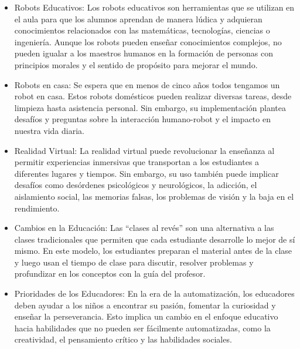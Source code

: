 \documentclass[letterpaper, 12pt]{article}
\begin{document}
\begin{itemize}[label=$\triangleright$]
    \item Robots Educativos: Los robots educativos son herramientas
          que se utilizan en el aula para que los alumnos aprendan de
          manera lúdica y adquieran conocimientos relacionados con
          las matemáticas, tecnologías, ciencias o ingeniería. Aunque
          los robots pueden enseñar conocimientos complejos, no
          pueden igualar a los maestros humanos en la formación de
          personas con principios morales y el sentido de propósito
          para mejorar el mundo.

    \item Robots en casa: Se espera que en menos de cinco años todos
          tengamos un robot en casa. Estos robots domésticos pueden
          realizar diversas tareas, desde limpieza hasta asistencia
          personal. Sin embargo, su implementación plantea desafíos y
          preguntas sobre la interacción humano-robot y el impacto en
          nuestra vida diaria.

    \item Realidad Virtual: La realidad virtual puede revolucionar la
          enseñanza al permitir experiencias inmersivas que
          transportan a los estudiantes a diferentes lugares y
          tiempos. Sin embargo, su uso también puede implicar
          desafíos como desórdenes psicológicos y neurológicos, la
          adicción, el aislamiento social, las memorias falsas, los
          problemas de visión y la baja en el rendimiento.

    \item Cambios en la Educación: Las ``clases al revés'' son una
          alternativa a las clases tradicionales que permiten que
          cada estudiante desarrolle lo mejor de sí mismo. En este
          modelo, los estudiantes preparan el material antes de la
          clase y luego usan el tiempo de clase para discutir,
          resolver problemas y profundizar en los conceptos con la
          guía del profesor.

    \item Prioridades de los Educadores: En la era de la
          automatización, los educadores deben ayudar a los niños a
          encontrar su pasión, fomentar la curiosidad y enseñar la
          perseverancia. Esto implica un cambio en el enfoque
          educativo hacia habilidades que no pueden ser fácilmente
          automatizadas, como la creatividad, el pensamiento crítico
          y las habilidades sociales.
\end{itemize}
\end{document}
